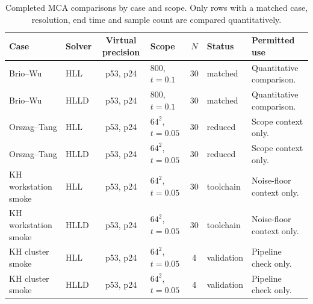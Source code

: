 \begin{table}[H]
\centering
\scriptsize
\begin{tabularx}{\textwidth}{@{}llclclX@{}}
\toprule
Case & Solver & Virtual precision & Scope & $N$ & Status & Permitted use \\
\midrule
Brio--Wu & HLL  & p53, p24 & $800$, $t=0.1$ & 30 & matched & Quantitative comparison. \\
Brio--Wu & HLLD & p53, p24 & $800$, $t=0.1$ & 30 & matched & Quantitative comparison. \\
Orszag--Tang & HLL  & p53, p24 & $64^2$, $t=0.05$ & 30 & reduced & Scope context only. \\
Orszag--Tang & HLLD & p53, p24 & $64^2$, $t=0.05$ & 30 & reduced & Scope context only. \\
KH workstation smoke & HLL  & p53, p24 & $64^2$, $t=0.05$ & 30 & toolchain & Noise-floor context only. \\
KH workstation smoke & HLLD & p53, p24 & $64^2$, $t=0.05$ & 30 & toolchain & Noise-floor context only. \\
KH cluster smoke & HLL  & p53, p24 & $64^2$, $t=0.05$ & 4 & validation & Pipeline check only. \\
KH cluster smoke & HLLD & p53, p24 & $64^2$, $t=0.05$ & 4 & validation & Pipeline check only. \\
\bottomrule
\end{tabularx}
\caption[MCA comparison status by case and scope]{Completed MCA comparisons by
case and scope. Only rows with a matched case, resolution, end time and sample
count are compared quantitatively.}
\label{tab:appendix-ch5-mca-status}
\end{table}
